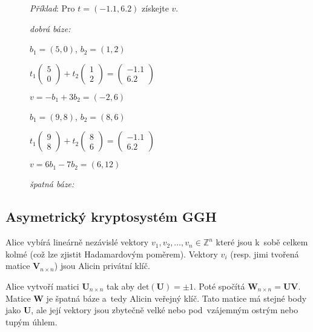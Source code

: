 \begin{figure}[ht]
    \emph{Příklad}: Pro $t = (-1.1, 6.2)$ získejte $v$.

    \begin{minipage}{0.5\textwidth}
        \centering
        \caption*{\emph{dobrá báze:}}

        $b_1 = (5, 0)$, $b_2 = (1, 2)$

        $t_1\left(\begin{matrix}5\\0\end{matrix}\right) + t_2 \left(\begin{matrix}1\\2\end{matrix}\right) = \left(\begin{matrix}-1.1\\6.2\end{matrix}\right)$

        $v = -b_1 + 3b_2 = (-2, 6)$
    \end{minipage}\hfill\begin{minipage}{0.5\textwidth}
        \centering
        \caption*{\emph{špatná báze:}}

        $b_1 = (9, 8)$, $b_2 = (8, 6)$

        $t_1\left(\begin{matrix}9\\8\end{matrix}\right) + t_2 \left(\begin{matrix}8\\6\end{matrix}\right) = \left(\begin{matrix}-1.1\\6.2\end{matrix}\right)$

        $v = 6b_1 - 7b_2 = (6, 12)$
    \end{minipage}
\end{figure}


\subsection{Asymetrický kryptosystém GGH}

Alice vybírá lineárně nezávislé vektory $v_1, v_2, \dots, v_n \in \mathbb{Z}^n$ které jsou k~sobě celkem kolmé (což lze zjistit Hadamardovým poměrem).
Vektory $v_i$ (resp. jimi tvořená matice $\textbf{V}_{n \times n}$) jsou Alicin privátní klíč.

Alice vytvoří matici $\textbf{U}_{n \times n}$ tak aby $\text{det}(\textbf{U}) = \pm 1$.
Poté spočítá $\textbf{W}_{n \times n} = \textbf{UV}$.
Matice $\textbf{W}$ je špatná báze a~tedy Alicin veřejný klíč.
Tato matice má stejné body jako \textbf{U}, ale její vektory jsou zbytečně velké nebo pod~vzájemným ostrým nebo tupým úhlem.

